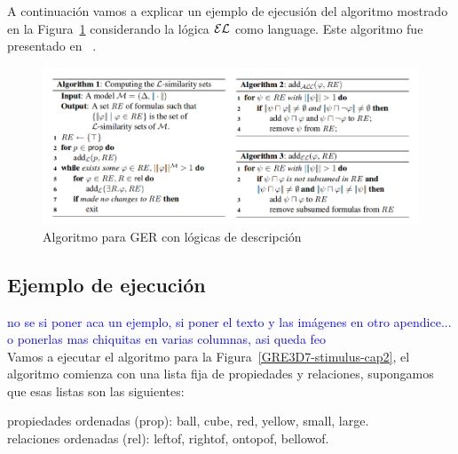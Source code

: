 A continuaci\'on vamos a explicar un ejemplo de ejecusi\'on del
algoritmo mostrado en la Figura~\ref{algoritmoOriginal} considerando la l\'ogica 
$\mathcal{EL}$ como language. Este algoritmo fue presentado en
~\cite{arec2:2008:Areces}.

\begin{figure}[h!]
\begin{center}
\includegraphics[width=\textwidth]{images/algoritmoOriginal.png}
\end{center}
\vspace*{-2em}
\caption{Algoritmo para GER con l\'ogicas de descripci\'on}
\label{algoritmoOriginal}
\end{figure}

\subsection{Ejemplo de ejecuci\'on}



\textcolor{blue}{no se si poner aca un ejemplo, si poner el texto y las im\'agenes en otro apendice... o ponerlas mas chiquitas en varias columnas, asi queda feo}\\
Vamos a ejecutar el algoritmo para la Figura~\ref{GRE3D7-stimulus-cap2},
el algoritmo comienza con una lista fija de propiedades y relaciones, supongamos que
esas listas son las siguientes:

propiedades ordenadas (prop): \textsf{ball}, \textsf{cube}, \textsf{red}, \textsf{yellow}, \textsf{small}, \textsf{large}.\\
relaciones ordenadas (rel): \textsf{leftof}, \textsf{rightof}, \textsf{ontopof}, \textsf{bellowof}.


